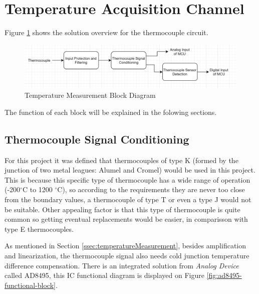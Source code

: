 \section{Temperature Acquisition Channel}\label{sec:temperatura-acquisition-channel}
	
	Figure \ref{fig:temperature-measurement-block-diagram} shows the solution overview for the thermocouple circuit.

	\begin{figure}[htbp]
		\centering
		\includegraphics[width=1\textwidth]{figuras/fig-temperature-measurement-block-diagram}
		\caption{Temperature Measurement Block Diagram}
		\label{fig:temperature-measurement-block-diagram}
	\end{figure}

	The function of each block will be explained in the folowing sections.
	
	\subsection{Thermocouple Signal Conditioning}\label{ssec:thermocouple-signal-conditioning}
		
		For this project it was defined that thermocouples of type K (formed by the junction of two metal leagues: Alumel and Cromel) would be used in this project. This is because this specific type of thermocouple has a wide range of operation (-200$^{\circ}$C to 1200 $^{\circ}$C), so according to the requirements they are never too close from the boundary values, a thermocouple of type T or even a type J would not be suitable. Other appealing factor is that this type of thermocouple is quite common so getting eventual replacements would be easier, in comparisson with type E thermocouples.
		\par
		As mentioned in Section \ref{ssec:temperatureMeasurement}, besides amplification and linearization, the thermocouple signal also needs cold junction temperature difference compensation. There is an integrated solution from \textit{Analog Device} called AD8495, this IC functional diagram is displayed on Figure \ref{fig:ad8495-functional-block}.
		

